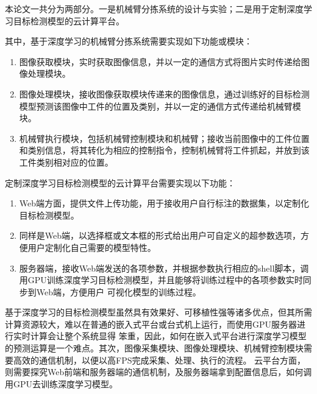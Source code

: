 本论文一共分为两部分。一是机械臂分拣系统的设计与实验；二是用于定制深度学习目标检测模型的云计算平台。

其中，基于深度学习的机械臂分拣系统需要实现如下功能或模块：
\begin{enumerate}
    \item{图像获取模块，实时获取图像信息，并以一定的通信方式将图片实时传递给图像处理模块。}
    \item{图像处理模块，接收图像获取模块传递来的图像信息，通过训练好的目标检测模型预测该图像中工件的位置及类别，并以一定的通信方式传递给机械臂模块。}
    \item{机械臂执行模块，包括机械臂控制模块和机械臂；接收当前图像中的工件位置和类别信息，将其转化为相应的控制指令，控制机械臂将工件抓起，并放到该工件类别相对应的位置。}
\end{enumerate}

定制深度学习目标检测模型的云计算平台需要实现以下功能：
\begin{enumerate}
    \item{Web端方面，提供文件上传功能，用于接收用户自行标注的数据集，以定制化目标检测模型。}
    \item{同样是Web端，以选择框或文本框的形式给出用户可自定义的超参数选项，方便用户定制化自己需要的模型特性。}
    \item{服务器端，接收Web端发送的各项参数，并根据参数执行相应的shell脚本，调用GPU训练深度学习目标检测模型，并且能够将训练过程中的各项参数实时同步到Web端，方便用户
    可视化模型的训练过程。}
\end{enumerate}

基于深度学习的目标检测模型虽然具有效果好、可移植性强等诸多优点，但其所需计算资源较大，难以在普通的嵌入式平台或台式机上运行，而使用GPU服务器进行实时计算会让整个系统显得
笨重，因此，如何在嵌入式平台进行深度学习模型的预测运算是一个难点。其次，图像采集模块、图像处理模块、机械臂控制模块需要高效的通信机制，以便以高FPS完成采集、处理、执行的流程。
云平台方面，则需要探究Web前端和服务器端的通信机制，及服务器端拿到配置信息后，如何调用GPU去训练深度学习模型。

